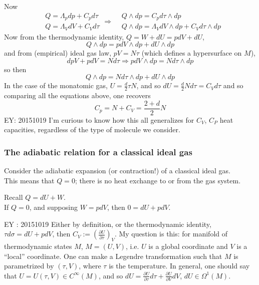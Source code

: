 Now 
\[
\begin{aligned}
  & Q = \Lambda_p dp + C_p d\tau \\ 
  & Q = \Lambda_V dV + C_V d\tau
\end{aligned} \Longrightarrow \begin{aligned}
  & Q \wedge dp = C_p d\tau \wedge dp \\ 
  & Q \wedge dp = \Lambda_V dV \wedge dp + C_V d\tau \wedge dp
\end{aligned}
\]
Now from the thermodynamic identity, $Q = W + dU = pdV + dU$,
\[
Q \wedge dp = p dV \wedge dp + dU \wedge dp
\]
and from (empirical) ideal gas law, $pV = N\tau$ (which defines a hypersurface on $M$),
\[
dp V + p dV = N d\tau \Longrightarrow p dV \wedge dp = N d\tau \wedge dp
\]
so then
\[
Q \wedge dp = N d\tau \wedge dp + dU \wedge dp
\]
In the case of the monatomic gas, $U = \frac{d}{2} \tau N$, and so $dU = \frac{d}{2} N d\tau = C_V d\tau$ and so comparing all the equations above, one recovers
\[
C_p = N + C_V = \frac{2+d}{2} N
\]
EY: 20151019 I'm curious to know how this all generalizes for $C_V$, $C_P$ heat capacities, regardless of the type of molecule we consider.  


\subsubsection*{The adiabatic relation for a classical ideal gas}

Consider the adiabatic expansion (or contraction!) of a classical ideal gas.  \\
This means that $Q=0$; there is no heat exchange to or from the gas system.  

Recall $Q = dU + W$.  \\
If $Q=0$, and supposing $W = pdV$, then $0 = dU + pdV$.  

EY : 20151019 Either by definition, or the thermodynamic identity, $\tau d\sigma = dU + pdV$, then $C_V := \left( \frac{ \partial U}{ \partial \tau} \right)_V$.  My question is this: for manifold of thermodynamic states $M$, $M=(U,V)$, i.e. $U$ is a global coordinate and $V$ is a ``local'' coordinate.  One can make a Legendre transformation such that $M$ is parametrized by $(\tau,V)$, where $\tau$ is the temperature.  In general, one should say that $U=U(\tau,V) \in C^{\infty}(M)$, and so $dU = \frac{ \partial U }{ \partial \tau} d\tau + \frac{ \partial U}{ \partial V} dV$, $dU \in \Omega^1(M)$.    

